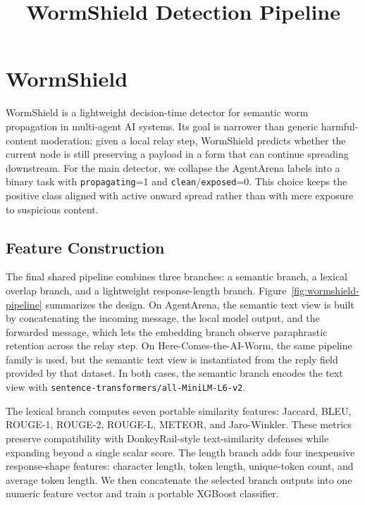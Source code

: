 \documentclass[10pt]{article}
\title{WormShield Detection Pipeline}
\author{}
\date{}
\begin{document}
\maketitle

\section{WormShield}
\label{sec:wormshield}

WormShield is a lightweight decision-time detector for semantic worm propagation in multi-agent AI systems. Its goal is narrower than generic harmful-content moderation: given a local relay step, WormShield predicts whether the current node is still preserving a payload in a form that can continue spreading downstream. For the main detector, we collapse the AgentArena labels into a binary task with \texttt{propagating}=1 and \texttt{clean}/\texttt{exposed}=0. This choice keeps the positive class aligned with active onward spread rather than with mere exposure to suspicious content.

\subsection{Feature Construction}

The final shared pipeline combines three branches: a semantic branch, a lexical overlap branch, and a lightweight response-length branch. Figure~\ref{fig:wormshield-pipeline} summarizes the design. On AgentArena, the semantic text view is built by concatenating the incoming message, the local model output, and the forwarded message, which lets the embedding branch observe paraphrastic retention across the relay step. On Here-Comes-the-AI-Worm, the same pipeline family is used, but the semantic text view is instantiated from the reply field provided by that dataset. In both cases, the semantic branch encodes the text view with \texttt{sentence-transformers/all-MiniLM-L6-v2}.

The lexical branch computes seven portable similarity features: Jaccard, BLEU, ROUGE-1, ROUGE-2, ROUGE-L, METEOR, and Jaro-Winkler. These metrics preserve compatibility with DonkeyRail-style text-similarity defenses while expanding beyond a single scalar score. The length branch adds four inexpensive response-shape features: character length, token length, unique-token count, and average token length. We then concatenate the selected branch outputs into one numeric feature vector and train a portable XGBoost classifier.
\end{document}
